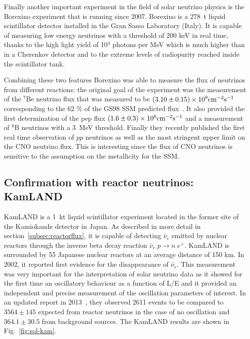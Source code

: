 Finally another important experiment in the field of solar neutrino physics is the Borexino experiment that is running since 2007. Borexino is a 278~t liquid scintillator detector installed in the Gran Sasso Laboratory (Italy). 
It is capable of measuring low energy neutrinos with a threshold of 200 keV in real time, thanks to the high light yield of 10$^4$ photons per MeV which is much higher than in a Cherenkov detector and to the extreme levels of radiopurity reached inside the scintillator tank. 

Combining these two features Borexino was able to measure the flux of neutrinos from different reactions: the original goal of the experiment was the measurement of the $^7$Be neutrino flux that was measured to be $(3.10 \pm 0.15) \times 10^9 {\rm cm^{-2} s^{-1}}$ corresponding to the 62 \% of the GS98 SSM predicted flux~\cite{bellini}. It also provided the first determination of the pep flux 
$(1.6 \pm 0.3) \times 10^8 { \rm cm^{-2} s^{-1}}$ and a measurement of $^8$B neutrinos with a 3~MeV threshold. 
Finally they recently published the first real time observation of $pp$ neutrinos 
as well as the most stringent upper limit on the CNO neutrino flux. This is interesting since the flux of CNO neutrinos is sensitive to the assumption on the metallicity for the SSM.


\subsection{Confirmation with reactor neutrinos: KamLAND}

KamLAND is a 1~kt liquid scintillator experiment located in the former site of the Kamiokande detector in Japan. As described in more detail in section~\ref{subsec:reactorflux}, it is capable of detecting $\bar \nu_e$ emitted by nuclear reactors through the inverse beta decay reaction $\bar{\nu}_e \; p \rightarrow n \;  e^+$. KamLAND is surrounded by 55 Japanese nuclear reactors at an average distance of 150 km. In 2002, it reported first evidence for the disappearance  of $\bar \nu_e$. This measurement was very important for the interpretation of solar neutrino data as it showed for the first time an oscillatory behaviour as a function of L/E and it provided an independent and precise measurement of the oscillation parameters of interest.
In an updated report in 2013~\cite{Gando:2013nba}, they observed 2611 
events to be compared to $3564 \pm 145$ expected from reactor neutrinos in the case of no oscillation and  $364.1 \pm 30.5$ from background sources.
The KamLAND results are shown in Fig.~\ref{fig:sol-kam}. 


